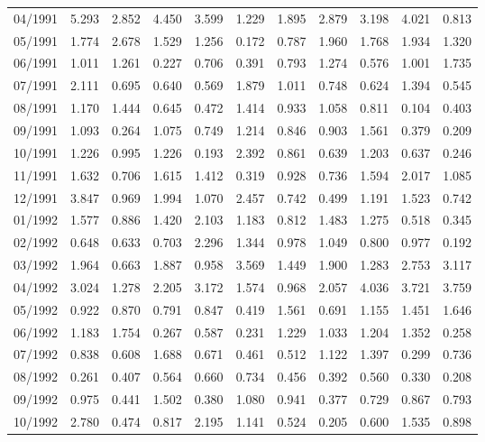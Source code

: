 \begin{tabular}{lrrrrrrrrrr}
04/1991 &  5.293 &  2.852 &  4.450 &  3.599 &  1.229 &  1.895 &  2.879 &  3.198 &  4.021 &  0.813 \\
05/1991 &  1.774 &  2.678 &  1.529 &  1.256 &  0.172 &  0.787 &  1.960 &  1.768 &  1.934 &  1.320 \\
06/1991 &  1.011 &  1.261 &  0.227 &  0.706 &  0.391 &  0.793 &  1.274 &  0.576 &  1.001 &  1.735 \\
07/1991 &  2.111 &  0.695 &  0.640 &  0.569 &  1.879 &  1.011 &  0.748 &  0.624 &  1.394 &  0.545 \\
08/1991 &  1.170 &  1.444 &  0.645 &  0.472 &  1.414 &  0.933 &  1.058 &  0.811 &  0.104 &  0.403 \\
09/1991 &  1.093 &  0.264 &  1.075 &  0.749 &  1.214 &  0.846 &  0.903 &  1.561 &  0.379 &  0.209 \\
10/1991 &  1.226 &  0.995 &  1.226 &  0.193 &  2.392 &  0.861 &  0.639 &  1.203 &  0.637 &  0.246 \\
11/1991 &  1.632 &  0.706 &  1.615 &  1.412 &  0.319 &  0.928 &  0.736 &  1.594 &  2.017 &  1.085 \\
12/1991 &  3.847 &  0.969 &  1.994 &  1.070 &  2.457 &  0.742 &  0.499 &  1.191 &  1.523 &  0.742 \\
01/1992 &  1.577 &  0.886 &  1.420 &  2.103 &  1.183 &  0.812 &  1.483 &  1.275 &  0.518 &  0.345 \\
02/1992 &  0.648 &  0.633 &  0.703 &  2.296 &  1.344 &  0.978 &  1.049 &  0.800 &  0.977 &  0.192 \\
03/1992 &  1.964 &  0.663 &  1.887 &  0.958 &  3.569 &  1.449 &  1.900 &  1.283 &  2.753 &  3.117 \\
04/1992 &  3.024 &  1.278 &  2.205 &  3.172 &  1.574 &  0.968 &  2.057 &  4.036 &  3.721 &  3.759 \\
05/1992 &  0.922 &  0.870 &  0.791 &  0.847 &  0.419 &  1.561 &  0.691 &  1.155 &  1.451 &  1.646 \\
06/1992 &  1.183 &  1.754 &  0.267 &  0.587 &  0.231 &  1.229 &  1.033 &  1.204 &  1.352 &  0.258 \\
07/1992 &  0.838 &  0.608 &  1.688 &  0.671 &  0.461 &  0.512 &  1.122 &  1.397 &  0.299 &  0.736 \\
08/1992 &  0.261 &  0.407 &  0.564 &  0.660 &  0.734 &  0.456 &  0.392 &  0.560 &  0.330 &  0.208 \\
09/1992 &  0.975 &  0.441 &  1.502 &  0.380 &  1.080 &  0.941 &  0.377 &  0.729 &  0.867 &  0.793 \\
10/1992 &  2.780 &  0.474 &  0.817 &  2.195 &  1.141 &  0.524 &  0.205 &  0.600 &  1.535 &  0.898 \\

\end{tabular}

